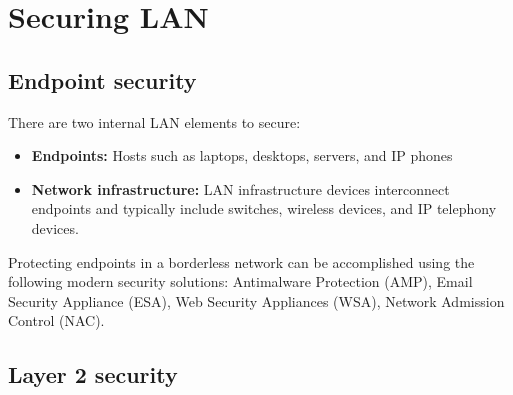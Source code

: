 \chapter{Securing LAN}

\section{Endpoint security}

There are two internal LAN elements to secure:

\begin{itemize}
\item \textbf{Endpoints:} Hosts  such as laptops, desktops, servers, and IP phones
\item \textbf{Network infrastructure:} LAN infrastructure devices interconnect endpoints and typically include switches, wireless devices, and IP telephony devices.
\end{itemize}

Protecting endpoints in a borderless network can be accomplished using the following modern security solutions: Antimalware Protection (AMP), Email Security Appliance (ESA), Web Security Appliances (WSA), Network Admission Control (NAC). 

\section{Layer 2 security}